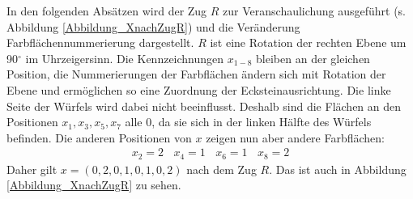 \documentclass[12pt,a4paper, usenames, dvipsnames]{article}
\theoremstyle{mystyle}
\theoremstyle{definition}
\begin{document}
In den folgenden Absätzen wird der Zug $R$ zur Veranschaulichung ausgeführt (s. Abbildung \ref{Abbildung_XnachZugR}) und die Veränderung Farbflächennummerierung dargestellt. $R$ ist eine Rotation der rechten Ebene um 90$^\circ$ im Uhrzeigersinn. 
Die Kennzeichnungen $x_{1-8}$ bleiben an der gleichen Position, die Nummerierungen  der Farbflächen ändern sich mit Rotation der Ebene und ermöglichen so eine Zuordnung der Ecksteinausrichtung. 
Die linke Seite der Würfels wird dabei nicht beeinflusst. Deshalb sind die Flächen an den Positionen $x_1, x_3, x_5, x_7$ alle 0, da sie sich in der linken Hälfte des Würfels befinden.
Die anderen Positionen von $x$ zeigen nun aber andere Farbflächen: 
\begin{align*}
x_2 = 2 \ \ \ \ x_4 = 1 \ \ \ \ x_6 = 1 \ \ \ \ x_8 = 2  
\end{align*}
Daher gilt $x = (0, 2, 0, 1, 0, 1, 0, 2)$ nach dem Zug $R$. Das ist auch in Abbildung \ref{Abbildung_XnachZugR} zu sehen.
\end{document}
